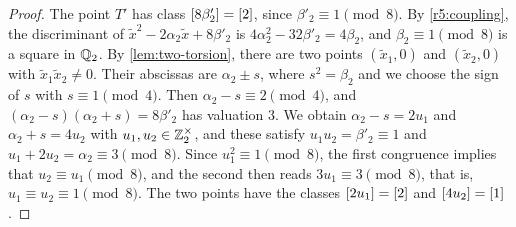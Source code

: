 \begin{proof}
The point $T'$ has class $[8\beta'_2]=[2]$, since $\beta'_2\equiv1\pmod8$. By \eqref{r5:coupling}, the discriminant of $\tilde x^2-2\alpha_2 \tilde x+8\beta'_2$ is $4\alpha_2^2-32\beta'_2=4\beta_2$, and $\beta_2\equiv1\pmod8$ is a square in $\mathbb Q_2$. By \cref{lem:two-torsion}, there are two points $(\tilde x_1,0)$ and $(\tilde x_2,0)$ with $\tilde x_1\tilde x_2\ne0$. Their abscissas are $\alpha_2\pm s$, where $s^2=\beta_2$ and we choose the sign of $s$ with $s\equiv1\pmod4$. Then $\alpha_2-s\equiv2\pmod4$, and $(\alpha_2-s)(\alpha_2+s)=8\beta'_2$ has valuation $3$. We obtain $\alpha_2-s=2u_1$ and $\alpha_2+s=4u_2$ with $u_1,u_2\in\mathbb Z_2^\times$, and these satisfy $u_1u_2=\beta'_2\equiv1$ and $u_1+2u_2=\alpha_2\equiv3\pmod8$. Since $u_1^2\equiv1\pmod8$, the first congruence implies that $u_2\equiv u_1\pmod8$, and the second then reads $3u_1\equiv3\pmod 8$, that is, $u_1\equiv u_2\equiv1\pmod8$. The two points have the classes $[2u_1]=[2]$ and $[4u_2]=[1]$.


\end{proof}
